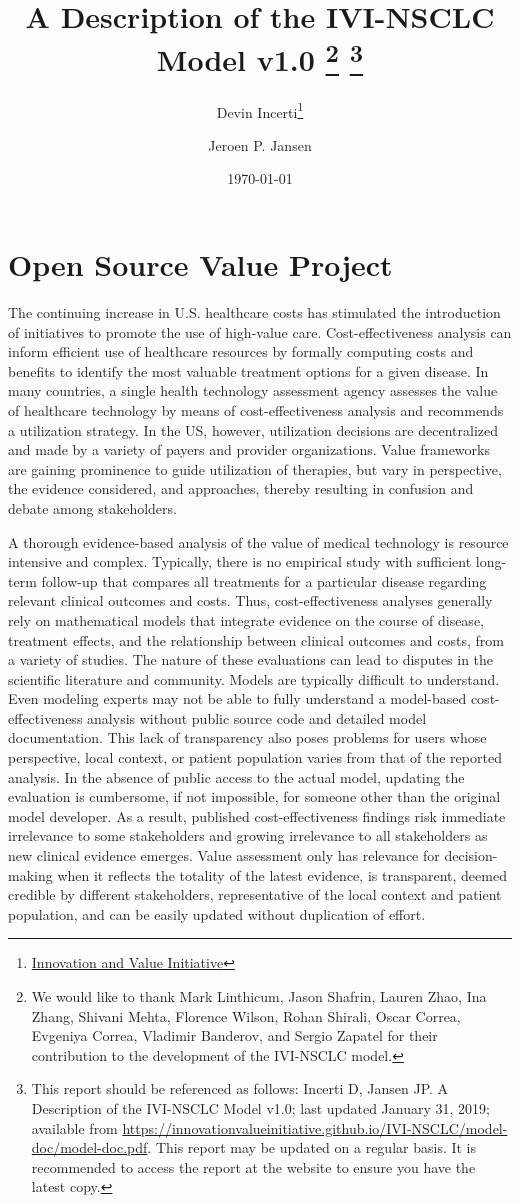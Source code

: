\documentclass[11pt,final,fleqn]{article}\usepackage[]{graphicx}\usepackage[]{color}
\title{A Description of the IVI-NSCLC Model v1.0
\thanks{We would like to thank Mark Linthicum, Jason Shafrin, Lauren Zhao, Ina Zhang, Shivani Mehta, Florence Wilson, Rohan Shirali, Oscar Correa, Evgeniya Correa, Vladimir Banderov, and Sergio Zapatel for their contribution to the development of the IVI-NSCLC model.} 
\footnote{This report should be referenced as follows: Incerti D, Jansen JP. A Description of the IVI-NSCLC Model v1.0; last updated January 31, 2019; available from \url{https://innovationvalueinitiative.github.io/IVI-NSCLC/model-doc/model-doc.pdf}. This report may be updated on a regular basis. It is recommended to access the report at the website to ensure you have the latest copy.}
}
\author{Devin Incerti\footnote{\href{http://www.thevalueinitiative.org/}{Innovation and Value Initiative}} \and Jeroen P. Jansen\sameaff}
\date{\today}
\theoremstyle{plain}
\begin{document}
\maketitle

\begingroup
 \hypersetup{linkcolor=black} \tableofcontents
 \listoffigures
 \listoftables
\endgroup

\clearpage
{}

\section{Open Source Value Project}\label{sec:osvp}
The continuing increase in U.S. healthcare costs has stimulated the introduction of initiatives to promote the use of high-value care.  Cost-effectiveness analysis can inform efficient use of healthcare resources by formally computing costs and benefits to identify the most valuable treatment options for a given disease.  In many countries, a single health technology assessment agency assesses the value of healthcare technology by means of cost-effectiveness analysis and recommends a utilization strategy. In the US, however, utilization decisions are decentralized and made by a variety of payers and provider organizations. Value frameworks are gaining prominence to guide utilization of therapies, but vary in perspective, the evidence considered, and approaches, thereby resulting in confusion and debate among stakeholders.

A thorough evidence-based analysis of the value of medical technology is resource intensive and complex.  Typically, there is no empirical study with sufficient long-term follow-up that compares all treatments for a particular disease regarding relevant clinical outcomes and costs. Thus, cost-effectiveness analyses generally rely on mathematical models that integrate evidence on the course of disease, treatment effects, and the relationship between clinical outcomes and costs, from a variety of studies. The nature of these evaluations can lead to disputes in the scientific literature and community. Models are typically difficult to understand. Even modeling experts may not be able to fully understand a model-based cost-effectiveness analysis without public source code and detailed model documentation. This lack of transparency also poses problems for users whose perspective, local context, or patient population varies from that of the reported analysis. In the absence of public access to the actual model, updating the evaluation is cumbersome, if not impossible, for someone other than the original model developer. As a result, published cost-effectiveness findings risk immediate irrelevance to some stakeholders and growing irrelevance to all stakeholders as new clinical evidence emerges. Value assessment only has relevance for decision-making when it reflects the totality of the latest evidence, is transparent, deemed credible by different stakeholders, representative of the local context and patient population, and can be easily updated without duplication of effort.
\end{document}
